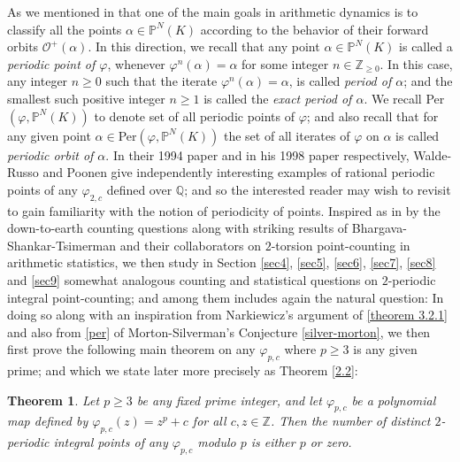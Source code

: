 \documentclass{article}
\theoremstyle{plain}
\newtheorem{thm}{Theorem}[section]
\theoremstyle{definition}
\begin{document}
As we mentioned in \cite{BK1} that one of the main 
goals in arithmetic dynamics is to classify all the points $\alpha\in\mathbb{P}^N(K)$ according to the behavior of their forward orbits $\mathcal{O}^{+}(\alpha)$. In this direction, we recall that any point $\alpha\in {\mathbb{P}^N(K)}$ is called a \textit{periodic point of $\varphi$}, whenever $\varphi^n (\alpha) = \alpha$ for some integer $n\in \mathbb{Z}_{\geq 0}$. In this case, any integer $n\geq 0$ such that the iterate $\varphi^n (\alpha) = \alpha$, is called \textit{period of $\alpha$}; and the smallest such positive integer $n\geq 1$ is called the \textit{exact period of $\alpha$}. We recall Per$(\varphi, {\mathbb{P}^N(K)})$ to denote set of all periodic points of $\varphi$; and also recall that for any given point $\alpha\in$Per$(\varphi, {\mathbb{P}^N(K)})$ the set of all iterates of $\varphi$ on $\alpha$ is called \textit{periodic orbit of $\alpha$}. In their 1994 paper \cite{Russo} and in his 1998 paper \cite{Poonen} respectively, Walde-Russo and Poonen give independently interesting examples of rational periodic points of any $\varphi_{2,c}$ defined over $\mathbb{Q}$; and so the interested reader may wish to revisit \cite{Russo, Poonen} to gain familiarity with the notion of periodicity of points. Inspired as in \cite{BK1, BK3} by the down-to-earth counting questions along with   striking results of Bhargava-Shankar-Tsimerman \cite{Ts} and their collaborators on $2$-torsion point-counting in arithmetic statistics, we then study in Section \ref{sec4}, \ref{sec5}, \ref{sec6}, \ref{sec7}, \ref{sec8} and \ref{sec9} somewhat analogous counting and statistical questions on $2$-periodic integral point-counting; and among them includes again the natural question:  In doing so along with an inspiration from Narkiewicz's argument of \ref{theorem 3.2.1} and also from \ref{per} of Morton-Silverman's Conjecture \ref{silver-morton}, we then first prove the following main theorem on any $\varphi_{p,c}$ where $p\geq 3$ is any given prime; and which we state later more precisely as Theorem \ref{2.2}:

\begin{thm}\label{Binder-Brian1}
Let $p\geq 3$ be any fixed prime integer, and let $\varphi_{p, c}$ be a polynomial map defined by $\varphi_{p, c}(z) = z^p+c$ for all $c, z\in\mathbb{Z}$. Then the number of distinct $2$-periodic integral points of any $\varphi_{p,c}$ modulo $p$ is either $p$ or zero.
\end{thm}
\end{document}
